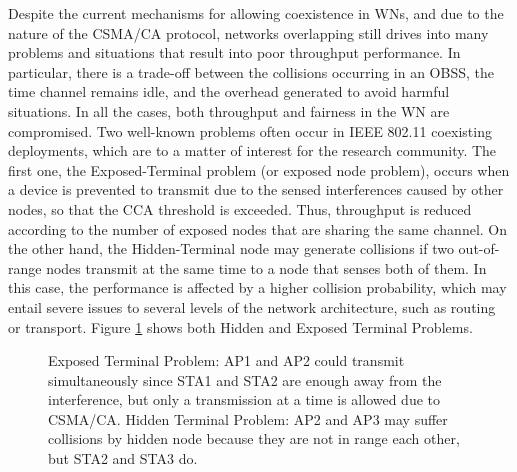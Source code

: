 \documentclass[12pt, a4paper,twoside]{tesi_upf}
\begin{document}
			Despite the current mechanisms for allowing coexistence in WNs, and due to the nature of the CSMA/CA protocol, networks overlapping still drives into many problems and situations that result into poor throughput performance. In particular, there is a trade-off between the collisions occurring in an OBSS, the time channel remains idle, and the overhead generated to avoid harmful situations. In all the cases, both throughput and fairness in the WN are compromised. Two well-known problems often occur in IEEE 802.11 coexisting deployments, which are to a matter of interest for the research community. The first one, the Exposed-Terminal problem (or exposed node problem), occurs when a device is prevented to transmit due to the sensed interferences caused by other nodes, so that the CCA threshold is exceeded. Thus, throughput is reduced according to the number of exposed nodes that are sharing the same channel. On the other hand, the Hidden-Terminal node may generate collisions if two out-of-range nodes transmit at the same time to a node that senses both of them. In this case, the performance is affected by a higher collision probability, which may entail severe issues to several levels of the network architecture, such as routing or transport. Figure \ref{fig:hidden_exposed} shows both Hidden and Exposed Terminal Problems.					
			\begin{figure}[h!]
				\centering
				\caption{Exposed Terminal Problem: AP1 and AP2 could transmit simultaneously since STA1 and STA2 are enough away from the interference, but only a transmission at a time is allowed due to CSMA/CA. Hidden Terminal Problem: AP2 and AP3 may suffer collisions by hidden node because they are not in range each other, but STA2 and STA3 do.}
				\label{fig:hidden_exposed}
			\end{figure}		
			
\end{document}
